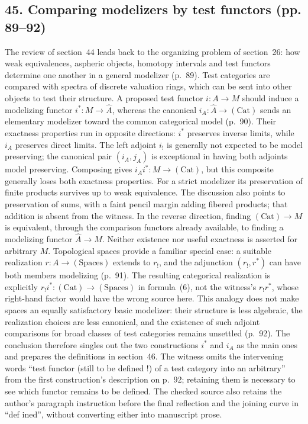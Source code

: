 \subsection*{45. Comparing modelizers by test functors (pp. 89--92)}
The review of section~44 leads back to the organizing problem of section~26: how weak equivalences, aspheric objects, homotopy intervals and test functors determine one another in a general modelizer (p.~89). Test categories are compared with spectra of discrete valuation rings, which can be sent into other objects to test their structure. A proposed test functor $i:A\to M$ should induce a modelizing functor $i^*:M\to\widehat A$, whereas the canonical $i_A:\widehat A\to(\mathrm{Cat})$ sends an elementary modelizer toward the common categorical model (p.~90). Their exactness properties run in opposite directions: $i^*$ preserves inverse limits, while $i_A$ preserves direct limits. The left adjoint $i_!$ is generally not expected to be model preserving; the canonical pair $(i_A,j_A)$ is exceptional in having both adjoints model preserving. Composing gives $i_Ai^*:M\to(\mathrm{Cat})$, but this composite generally loses both exactness properties. For a strict modelizer its preservation of finite products survives up to weak equivalence. The discussion also points to preservation of sums, with a faint pencil margin adding fibered products; that addition is absent from the witness. In the reverse direction, finding $(\mathrm{Cat})\to M$ is equivalent, through the comparison functors already available, to finding a modelizing functor $\widehat A\to M$. Neither existence nor useful exactness is asserted for arbitrary $M$. Topological spaces provide a familiar special case: a suitable realization $r:A\to(\mathrm{Spaces})$ extends to $r_!$, and the adjunction $(r_!,r^*)$ can have both members modelizing (p.~91). The resulting categorical realization is explicitly $r_!i^*:(\mathrm{Cat})\to(\mathrm{Spaces})$ in formula~(6), not the witness's $r_!r^*$, whose right-hand factor would have the wrong source here. This analogy does not make spaces an equally satisfactory basic modelizer: their structure is less algebraic, the realization choices are less canonical, and the existence of such adjoint comparisons for broad classes of test categories remains unsettled (p.~92). The conclusion therefore singles out the two constructions $i^*$ and $i_A$ as the main ones and prepares the definitions in section~46. The witness omits the intervening words ``test functor (still to be defined !) of a test category into an arbitrary'' from the first construction's description on p.~92; retaining them is necessary to see which functor remains to be defined. The checked source also retains the author's paragraph instruction before the final reflection and the joining curve in ``def ined'', without converting either into manuscript prose.

